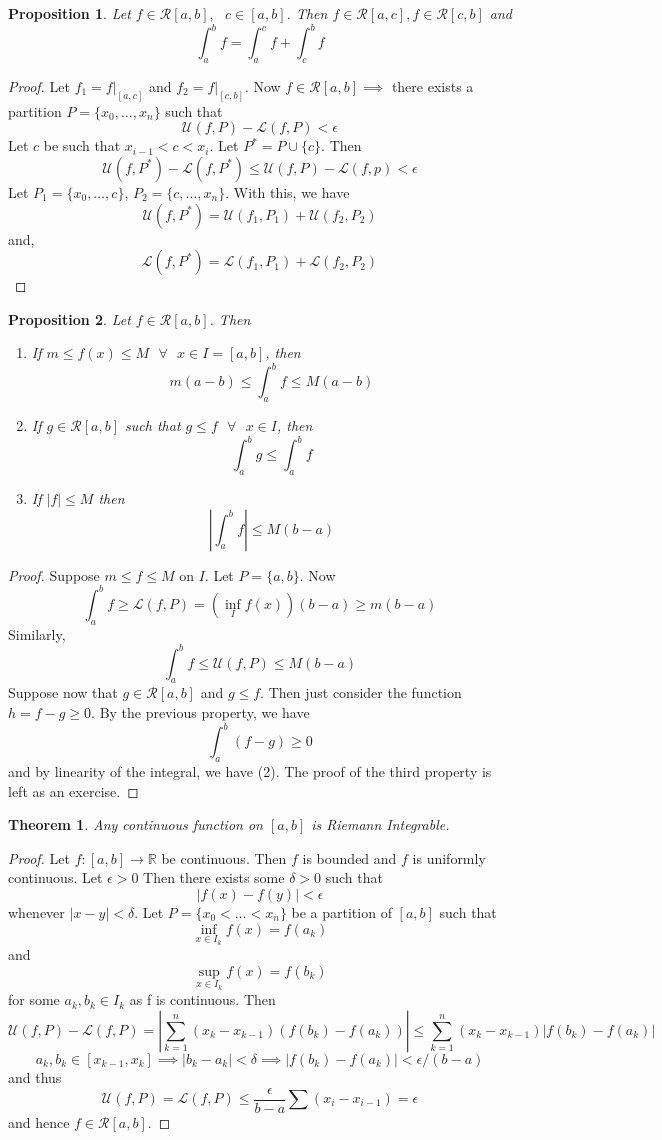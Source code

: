 \documentclass{article}
\newtheorem{theorem}{Theorem}
\newtheorem{proposition}{Proposition}
\begin{document}
\begin{proposition}
    Let $f\in \mathcal{R}[a,b],\text{ }c\in [a,b]$. Then $f\in \mathcal{R}[a,c],f\in\mathcal{R}[c,b]$ and 
    $$\int_a^b f=\int_a^c f+\int_c^b f$$
\end{proposition}
\begin{proof}
Let $f_1=f|_{[a,c]}$ and $f_2=f|_{[c,b]}$. Now $f\in\mathcal{R}[a,b]\implies$ there exists a partition $P=\{x_0,\dots,x_n\}$ such that 
$$\mathcal{U}(f,P)-\mathcal{L}(f,P)<\epsilon$$
Let $c$ be such that $x_{i-1}<c<x_i$. Let $P^{*}=P\cup\{c\}$. Then 
$$\mathcal{U}(f,P^*)-\mathcal{L}(f,P^*)\leq \mathcal{U}(f,P)-\mathcal{L}(f,p)<\epsilon$$
Let $P_1=\{x_0,\dots,c\}$, $P_2=\{c,\dots,x_n\}$. With this, we have
$$\mathcal{U}(f,P^*)=\mathcal{U}(f_1,P_1)+\mathcal{U}(f_2,P_2)$$
and,
$$\mathcal{L}(f,P^*)=\mathcal{L}(f_1,P_1)+\mathcal{L}(f_2,P_2)$$
\end{proof}
\begin{proposition}
    Let $f\in\mathcal{R}[a,b]$. Then 
    \begin{enumerate}
    \item If $m\leq f(x)\leq M \text{ }\forall \text{ }x\in I=[a,b]$, then 
    $$m(a-b)\leq\int_a^b f\leq M(a-b)$$
    \item If $g\in\mathcal{R}[a,b]$ such that $g\leq f \text{ }\forall\text{ }x\in I$, then 
    $$\int_a^b g\leq\int_a^b f$$
    \item If $|f|\leq M$ then 
    $$|\int_a^b f|\leq M(b-a)$$
    \end{enumerate}
\end{proposition}
\begin{proof}
Suppose $m\leq f\leq M$ on $I$. Let $P=\{a,b\}$. Now 
$$\int_a^b f\geq \mathcal{L}(f,P)=(\inf_{I}f(x))(b-a)\geq m(b-a)$$
Similarly, 
$$\int_a^b f\leq \mathcal{U}(f,P)\leq M(b-a)$$
Suppose now that $g\in\mathcal{R}[a,b]$ and $g\leq f$. Then just consider the function $h=f-g\geq 0$. By the previous property, we have
$$\int_a^b(f-g)\geq 0$$
and by linearity of the integral, we have (2). The proof of the third property is left as an exercise.
\end{proof}
\begin{theorem}
Any continuous function on $[a,b]$ is Riemann Integrable.
\end{theorem}
\begin{proof}
Let $f:[a,b]\to\mathbb{R}$ be continuous. Then $f$ is bounded and $f$ is uniformly continuous. Let $\epsilon>0$ Then there exists some $\delta>0$ such that 
$$|f(x)-f(y)|<\epsilon$$
whenever $|x-y|<\delta$. Let $P=\{x_0<\dots<x_n\}$ be a partition of $[a,b]$ such that
$$\inf_{x\in I_k}f(x)=f(a_k)$$
and $$\sup_{x\in I_k}f(x)=f(b_k)$$
for some $a_k,b_k\in I_k$ as f is continuous. Then 
$$\mathcal{U}(f,P)-\mathcal{L}(f,P)=|\sum_{k=1}^n(x_k-x_{k-1})(f(b_k)-f(a_k))|\leq\sum_{k=1}^n (x_k-x_{k-1})|f(b_k)-f(a_k)|$$ 
$$a_k,b_k\in[x_{k-1},x_k]\implies |b_k-a_k|<\delta\implies |f(b_k)-f(a_k)|<\epsilon/(b-a)$$
and thus 
$$\mathcal{U}(f,P)=\mathcal{L}(f,P)\leq \frac{\epsilon}{b-a}\sum(x_i-x_{i-1})=\epsilon$$
and hence $f\in\mathcal{R}[a,b]$.
\end{proof}
\end{document}
